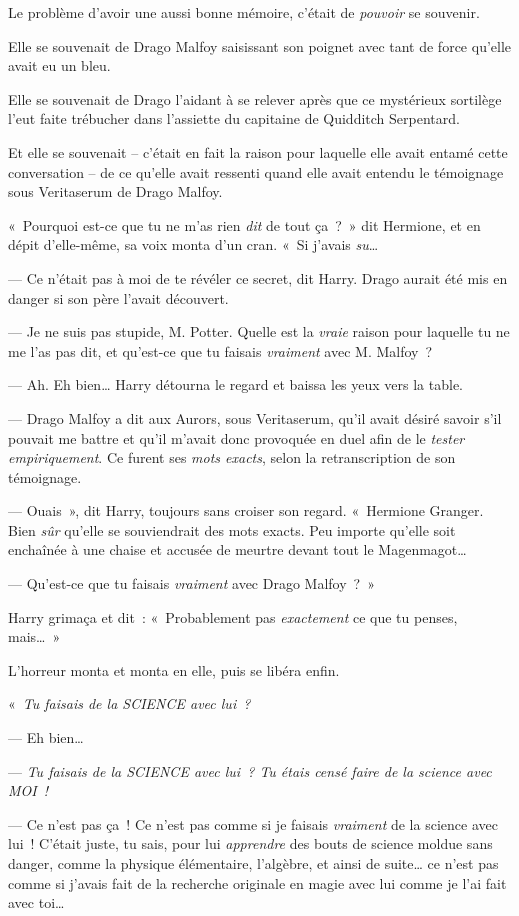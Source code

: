 Le problème d'avoir une aussi bonne mémoire, c'était de \emph{pouvoir} se souvenir.

Elle se souvenait de Drago Malfoy saisissant son poignet avec tant de force qu'elle avait eu un bleu.

Elle se souvenait de Drago l'aidant à se relever après que ce mystérieux sortilège l'eut faite trébucher dans l'assiette du capitaine de Quidditch Serpentard.

Et elle se souvenait -- c'était en fait la raison pour laquelle elle avait entamé cette conversation -- de ce qu'elle avait ressenti quand elle avait entendu le témoignage sous Veritaserum de Drago Malfoy.

«~Pourquoi est-ce que tu ne m'as rien \emph{dit} de tout ça~?~»
dit Hermione, et en dépit d'elle-même, sa voix monta d'un cran.
«~Si j'avais \emph{su}…

--- Ce n'était pas à moi de te révéler ce secret, dit Harry.
Drago aurait été mis en danger si son père l'avait découvert.

--- Je ne suis pas stupide, M. Potter.
Quelle est la \emph{vraie} raison pour laquelle tu ne me l'as pas dit, et qu'est-ce que tu faisais \emph{vraiment} avec M. Malfoy~?

--- Ah. Eh bien…
Harry détourna le regard et baissa les yeux vers la table.

--- Drago Malfoy a dit aux Aurors, sous Veritaserum, qu'il avait désiré savoir s'il pouvait me battre et qu'il m'avait donc provoquée en duel afin de le \emph{tester empiriquement}.
Ce furent ses \emph{mots exacts}, selon la retranscription de son témoignage.

--- Ouais~», dit Harry, toujours sans croiser son regard.
«~Hermione Granger.
Bien \emph{sûr} qu'elle se souviendrait des mots exacts.
Peu importe qu'elle soit enchaînée à une chaise et accusée de meurtre devant tout le Magenmagot…

--- Qu'est-ce que tu faisais \emph{vraiment} avec Drago Malfoy~?~»

Harry grimaça et dit~: «~Probablement pas \emph{exactement} ce que tu penses, mais…~»

L'horreur monta et monta en elle, puis se libéra enfin.

«~\emph{Tu faisais de la SCIENCE avec lui~?}

--- Eh bien…

--- \emph{Tu faisais de la SCIENCE avec lui~?
Tu étais censé faire de la science avec MOI~!}

--- Ce n'est pas ça~!
Ce n'est pas comme si je faisais \emph{vraiment} de la science avec lui~!
C'était juste, tu sais, pour lui \emph{apprendre} des bouts de science moldue sans danger, comme la physique élémentaire, l'algèbre, et ainsi de suite… ce n'est pas comme si j'avais fait de la recherche originale en magie avec lui comme je l'ai fait avec toi…

